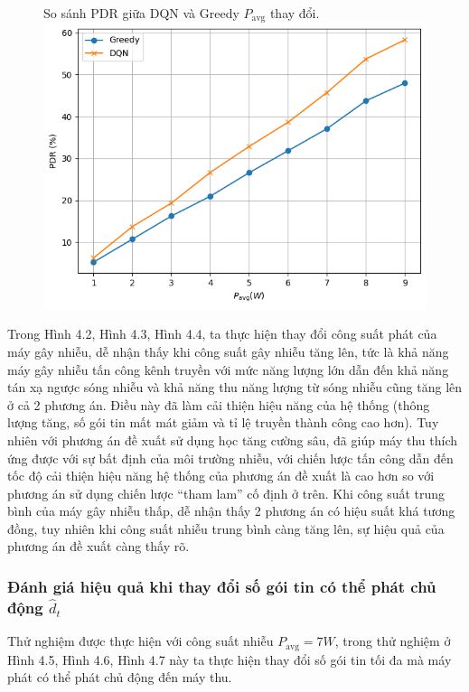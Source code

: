 \documentclass{uetgraduation}
\begin{document}
\begin{figure}{So sánh PDR giữa DQN và Greedy $P_\text{avg}$ thay đổi.}
    \centering
    \includegraphics[scale=0.8]{p_avg_pdr}
    \label{fig:p_avg_pdr}
\end{figure}

Trong Hình 4.2, Hình 4.3, Hình 4.4, ta thực hiện thay đổi công suất phát của máy gây nhiễu, dễ nhận thấy khi công suất gây nhiễu tăng lên, tức là khả năng 
máy gây nhiễu tấn công kênh truyền với mức năng lượng lớn dẫn đến khả năng tán xạ ngược sóng nhiễu và khả năng thu năng lượng từ sóng nhiễu cũng tăng lên ở 
cả 2 phương án. Điều này đã làm cải thiện hiệu năng của hệ thống (thông lượng tăng, số gói tin mất mát giảm và tỉ lệ truyền thành công cao hơn). Tuy nhiên 
với phương án đề xuất sử dụng học tăng cường sâu, đã giúp máy thu thích ứng được với sự bất định của môi trường nhiễu, với chiến lược tấn công dẫn đến tốc độ 
cải thiện hiệu năng hệ thống của phương án đề xuất là cao hơn so với phương án sử dụng chiến lược “tham lam” cố định ở trên. Khi công suất trung bình của máy 
gây nhiễu thấp, dễ nhận thấy 2 phương án có hiệu suất khá tương đồng, tuy nhiên khi công suất nhiễu trung bình càng tăng lên, sự hiệu quả của phương án đề xuất 
càng thấy rõ.

\subsubsection{Đánh giá hiệu quả khi thay đổi số gói tin có thể phát chủ động $\hat{d}_t$}
Thử nghiệm được thực hiện với công suất nhiễu $P_\text{avg} = 7W$, trong thử nghiệm ở Hình 4.5, Hình 4.6, Hình 4.7 này ta thực hiện thay đổi số gói tin tối đa mà máy phát
có thể phát chủ động đến máy thu.
\end{document}
